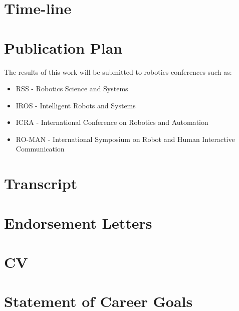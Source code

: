 \documentclass[12pt,a4paper]{article}
\begin{document}
\section{Time-line}



\newpage
\section{Publication Plan}
The results of this work will be submitted to robotics conferences such as:
\begin{itemize}
 \item RSS - Robotics Science and Systems
 \item IROS - Intelligent Robots and Systems
 \item ICRA - International Conference on Robotics and Automation
 \item RO-MAN - International Symposium on Robot and Human Interactive Communication
\end{itemize}

\section{Transcript}
\section{Endorsement Letters}
\section{CV}
\section{Statement of Career Goals}
\end{document}
